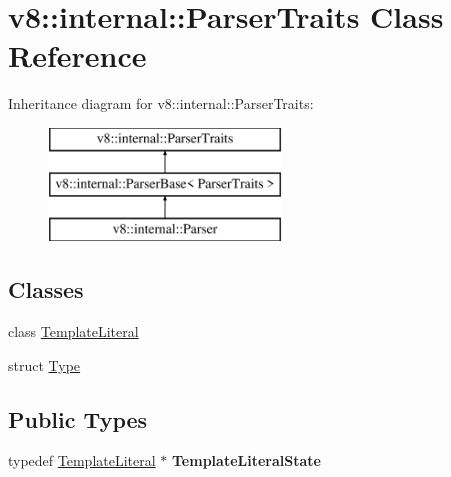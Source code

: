 \hypertarget{classv8_1_1internal_1_1_parser_traits}{}\section{v8\+:\+:internal\+:\+:Parser\+Traits Class Reference}
\label{classv8_1_1internal_1_1_parser_traits}
Inheritance diagram for v8\+:\+:internal\+:\+:Parser\+Traits\+:\begin{figure}[H]
\begin{center}
\leavevmode
\includegraphics[height=3.000000cm]{classv8_1_1internal_1_1_parser_traits}
\end{center}
\end{figure}
\subsection*{Classes}
\begin{DoxyCompactItemize}
\item 
class \hyperlink{classv8_1_1internal_1_1_parser_traits_1_1_template_literal}{Template\+Literal}
\item 
struct \hyperlink{structv8_1_1internal_1_1_parser_traits_1_1_type}{Type}
\end{DoxyCompactItemize}
\subsection*{Public Types}
\begin{DoxyCompactItemize}
\item 
typedef \hyperlink{classv8_1_1internal_1_1_parser_traits_1_1_template_literal}{Template\+Literal} $\ast$ {\bfseries Template\+Literal\+State}\hypertarget{classv8_1_1internal_1_1_parser_traits_aa19672f28198f667f77e9dd756b16948}{}\label{classv8_1_1internal_1_1_parser_traits_aa19672f28198f667f77e9dd756b16948}

\end{DoxyCompactItemize}
